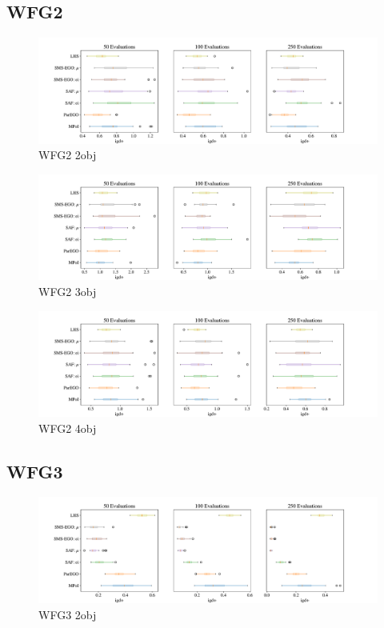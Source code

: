 \documentclass[
dvipsnames, table,   %
format=acmsmall,     %
anonymous=true,      %
authorversion=false, %
]{acmart}
\begin{document}
\subsection{WFG2}
\begin{figure}[h]
    \centering
    \includegraphics[width=\textwidth]{figures/wfg2_2obj_6dim_igd_boxplot.pdf}
    \caption{WFG2 2obj}
    \label{fig:boxplot WFG2_2obj_6dim}
\end{figure}

\begin{figure}[h]
    \centering
    \includegraphics[width=\textwidth]{figures/wfg2_3obj_6dim_igd_boxplot.pdf}
    \caption{WFG2 3obj}
    \label{fig:boxplot WFG2_3obj_6dim}
\end{figure}

\begin{figure}[h]
    \centering
    \includegraphics[width=\textwidth]{figures/wfg2_4obj_10dim_igd_boxplot.pdf}
    \caption{WFG2 4obj}
    \label{fig:boxplot WFG2_4obj_10dim}
\end{figure}
\clearpage

\subsection{WFG3}
\begin{figure}[h]
    \centering
    \includegraphics[width=\textwidth]{figures/wfg3_2obj_6dim_igd_boxplot.pdf}
    \caption{WFG3 2obj}
    \label{fig:boxplot WFG3_2obj_6dim}
\end{figure}
\end{document}
